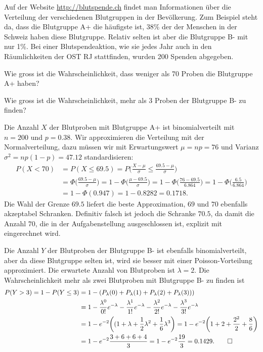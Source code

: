 Auf der Website \url{http://blutspende.ch} findet man Informationen
über die Verteilung der verschiedenen Blutgruppen in der
Bevölkerung.
Zum Beispiel steht da, dass die Blutgruppe A+ die häufigste ist, 38\%
der der Menschen in der Schweiz haben diese Blutgruppe.
Relativ selten ist aber die Blutgruppe B- mit nur 1\%.
Bei einer Blutspendeaktion, wie sie jedes Jahr auch in den Räumlichkeiten
der OST RJ stattfinden, wurden 200 Spenden abgegeben.
\begin{teilaufgaben}
\item
Wie gross ist die Wahrscheinlichkeit, dass weniger als 70 Proben die
Blutgruppe A+ haben?
\item
Wie gross ist die Wahrscheinlichkeit, mehr als 3 Proben der Blutgruppe B-
zu finden?
\end{teilaufgaben}


\begin{loesung}
\begin{teilaufgaben}
\item
Die Anzahl $X$ der Blutproben mit Blutgruppe A+ ist binomialverteilt mit
$n=200$ und $p=0.38$.
Wir approximieren die Verteilung mit der Normalverteilung, dazu müssen
wir mit Erwartungswert $\mu=np=76$ und Varianz $\sigma^2=np(1-p)=47.12$
standardisieren:
\begin{align*}
P(X<70)
&=
P(X\le 69.5)
=
P\biggl(
\frac{X-\mu}{\sigma} \le \frac{69.5-\mu}{\sigma}
\biggr)
\\
&=
\Phi\biggl(
\frac{69.5-\mu}{\sigma}
\biggr)
=
1-\Phi\biggl(
\frac{\mu-69.5}{\sigma}
\biggr)
=
1-\Phi\biggl(
\frac{76-69.5}{6.864}
\bigr)
=
1-\Phi\biggl(
\frac{6.5}{6.864}
\biggr)
\\
&=
1-\Phi(0.947)
=
1-0.8282
=
0.1718.
\end{align*}
Die Wahl der Grenze $69.5$ liefert die beste Approximation, $69$ und $70$
ebenfalls akzeptabel Schranken.
Definitiv falsch ist jedoch die Schranke $70.5$, da damit die Anzahl $70$,
die in der Aufgabenstellung ausgeschlossen ist, explizit mit eingerechnet
wird.
\item
Die Anzahl $Y$ der Blutproben der Blutgruppe B- ist ebenfalls binomialverteilt,
aber da diese Blutgruppe selten ist, wird sie besser mit einer
Poisson-Vorteilung approximiert.
Die erwartete Anzahl von Blutproben ist $\lambda=2$.
Die Wahrscheinlichkeit mehr als zwei Blutproben mit Blutgruppe B-
zu finden ist
\begin{align*}
P(Y>3)
=
1-P(Y\le 3)
&=
1-(
P_{\lambda}(0)
+
P_{\lambda}(1)
+
P_{\lambda}(2)
+
P_{\lambda}(3)
)
)
\\
&=
1
-
\frac{\lambda^0}{0!}e^{-\lambda}
-
\frac{\lambda^1}{1!}e^{-\lambda}
-
\frac{\lambda^2}{2!}e^{-\lambda}
-
\frac{\lambda^3}{3!}e^{-\lambda}
\\
&=
1-e^{-2}\biggl((1+\lambda+\frac12\lambda^2+\frac16\lambda^3\biggr)
=
1-e^{-2}\biggl(1+2+\frac{2^2}{2}+\frac{8}{6}\biggr)
\\
&=
1-e^{-2}\frac{3+6+6+4}{3}
=
1-e^{-2}\frac{19}{3}
=
0.1429.
\qedhere
\end{align*}
\end{teilaufgaben}
\end{loesung}


